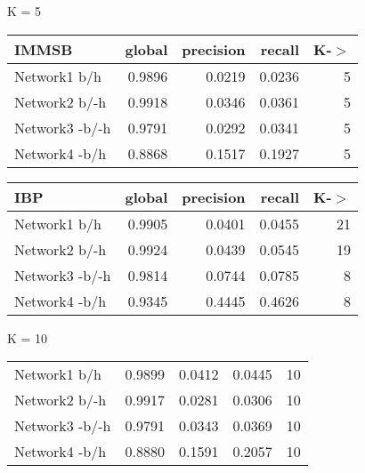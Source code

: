 

\begin{table*}[h] \label{table:unbalanced}
\caption{Predictive Performance on a UnBalanced Testing set}
	\begin{minipage}[h]{0.45\linewidth} 
K = 5\hspace{5pt}
\begin{tabular}{lrrrr}
\hline
 IMMSB   &   global &   precision &   recall &    K-\ensuremath{>} \\
\hline
 Network1 b/h          &   0.9896 &      0.0219 &   0.0236 & 5 \\
 Network2 b/-h       &   0.9918 &      0.0346 &   0.0361 & 5 \\
 Network3 -b/-h      &   0.9791 &      0.0292 &   0.0341 & 5 \\
 Network4 -b/h        &   0.8868 &      0.1517 &   0.1927 & 5 \\
\hline
\end{tabular}
\end{minipage}
\hspace{0.5cm}
\begin{minipage}[h]{0.45\linewidth}
\begin{tabular}{lrrrr}
\hline
 IBP    &   global &   precision &   recall &     K-\ensuremath{>} \\
\hline
 Network1 b/h        &   0.9905 &      0.0401 &   0.0455 & 21 \\
 Network2 b/-h     &   0.9924 &      0.0439 &   0.0545 & 19 \\
 Network3 -b/-h    &   0.9814 &      0.0744 &   0.0785 &  8 \\
 Network4 -b/h      &   0.9345 &      0.4445 &   0.4626 &  8 \\
\hline
\end{tabular}
\end{minipage}


	\begin{minipage}[h]{0.45\linewidth} 
K = 10
\begin{tabular}{lrrrr}

 Network1 b/h          &   0.9899 &      0.0412 &   0.0445 & 10 \\
 Network2 b/-h       &   0.9917 &      0.0281 &   0.0306 & 10 \\
 Network3 -b/-h      &   0.9791 &      0.0343 &   0.0369 & 10 \\
 Network4 -b/h        &   0.8880 &      0.1591 &   0.2057 & 10 \\
\hline
\end{tabular}
\end{minipage}
\hspace{0.5cm}
\begin{minipage}[h]{0.45\linewidth}
\begin{tabular}{lrrrr}


\end{tabular}
\end{minipage}
\end{table*}
